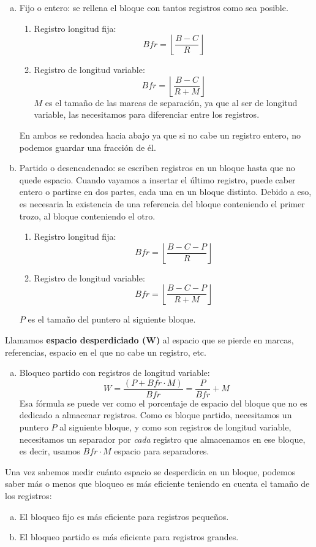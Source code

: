 \begin{enumerate}[(a)]
\item Fijo o entero: se rellena el bloque con tantos registros como sea posible.
\begin{enumerate}
\item Registro longitud fija:
\[
Bfr=\left\lfloor\frac{B-C}{R}\right\rfloor
\]
\item Registro de longitud variable:
\[
Bfr=\left\lfloor\frac{B-C}{R+M}\right\rfloor
\]
$M$ es el tamaño de las marcas de separación, ya que al ser de longitud variable, las necesitamos para diferenciar entre los registros.
\end{enumerate}
En ambos se redondea hacia abajo ya que si no cabe un registro entero, no podemos guardar una fracción de él.
\item Partido o desencadenado: se escriben registros en un bloque hasta que no quede espacio. Cuando vayamos a insertar el último registro, puede caber entero o partirse en dos partes, cada una en un bloque distinto. Debido a eso, es necesaria la existencia de una referencia del bloque conteniendo el primer trozo, al bloque conteniendo el otro.
\begin{enumerate}
\item Registro longitud fija:
\[
Bfr=\left\lfloor\frac{B-C-P}{R}\right\rfloor
\]
\item Registro de longitud variable:
\[
Bfr=\left\lfloor\frac{B-C-P}{R+M}\right\rfloor
\]
\end{enumerate}
$P$ es el tamaño del puntero al siguiente bloque.
\end{enumerate}

Llamamos \textbf{espacio desperdiciado (W)} al espacio que se pierde en marcas, referencias, espacio en el que no cabe un registro,  etc.
\begin{enumerate}[(a)]
\item Bloqueo partido con registros de longitud variable:
\[
W=\frac{(P+Bfr \cdot M)}{Bfr}=\frac{P}{Bfr}+M
\]
Esa fórmula se puede ver como el porcentaje de espacio del bloque que no es dedicado a almacenar registros. Como es bloque partido, necesitamos un puntero $P$ al siguiente bloque, y como son registros de longitud variable, necesitamos un separador por \textit{cada} registro que almacenamos en ese bloque, es decir, usamos $Bfr\cdot M$ espacio para separadores.
\end{enumerate}

Una vez sabemos medir cuánto espacio se desperdicia en un bloque, podemos saber más o menos que bloqueo es más eficiente teniendo en cuenta el tamaño de los registros:
\begin{enumerate}[(a)]
\item El bloqueo fijo es más eficiente para registros pequeños.
\item El bloqueo partido es más eficiente para registros grandes.
\end{enumerate}

